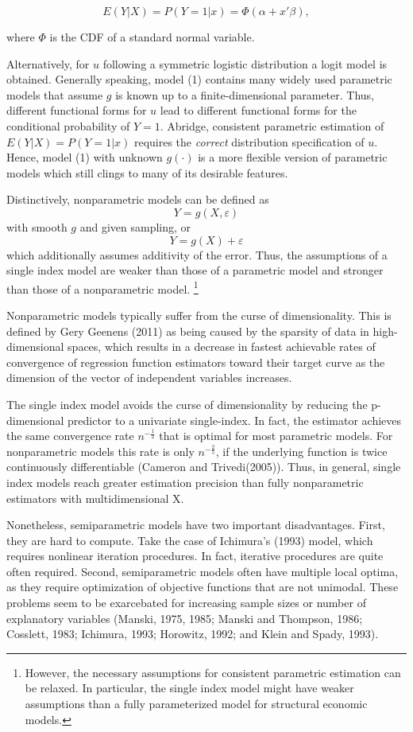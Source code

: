 \documentclass[a4paper]{article}
\begin{document}
\[
E(Y|X) = P(Y=1|x) = \Phi(\alpha + x'\beta),
\]

where $\Phi$ is the CDF of a standard normal variable. 

Alternatively, for $u$ following a symmetric logistic distribution a logit model is obtained. Generally speaking, model (1) contains many widely used parametric models that assume $g$ is known up to a finite-dimensional parameter. Thus, different functional forms for $u$ lead to different functional forms for the conditional probability of $Y = 1$. Abridge, consistent parametric estimation of $E(Y|X) = P(Y=1|x)$ requires the \textit{correct} distribution specification of $u$. 
Hence, model (1) with unknown $g(\cdot)$ is a more flexible version of parametric models which still clings to many of its desirable features. 

Distinctively, nonparametric models can be defined as
\[Y = g(X, \varepsilon)\]
with smooth $g$ and given sampling,  or  
\[Y = g(X) + \varepsilon\]
which additionally assumes additivity of the error. Thus, the assumptions of a single index model are weaker than those of a parametric model and stronger than those of a nonparametric model.  \footnote{However, the necessary assumptions for consistent parametric estimation can be relaxed. In particular, the single index model might have weaker assumptions than a fully parameterized model for structural economic models.} 

Nonparametric models typically suffer from the curse of dimensionality. This is defined by Gery Geenens (2011) as being caused by the sparsity of data in high-dimensional spaces, which results in a decrease in fastest achievable rates of convergence of regression function estimators toward their target curve as the dimension of the vector of independent variables increases. 

The single index model avoids the curse of dimensionality by reducing the p-dimensional predictor to a univariate single-index. In fact, the estimator achieves the same convergence rate $n^{-\frac{1}{2}}$ that is optimal for most parametric models. For nonparametric models this rate is only $n^{-\frac{2}{5}}$, if the underlying function is twice continuously differentiable (Cameron and Trivedi(2005)).
Thus, in general, single index models reach greater estimation precision than fully nonparametric estimators with multidimensional X.



Nonetheless, semiparametric models have two important disadvantages. First, they are hard to compute. Take the case of Ichimura's (1993) model, which requires nonlinear iteration procedures. In fact, iterative procedures are quite often required. Second, semiparametric models often have multiple local optima, as they require optimization of objective functions that are not unimodal. These problems seem to be exarcebated for increasing sample sizes or number of explanatory variables (Manski, 1975, 1985; Manski and Thompson, 1986; Cosslett, 1983; Ichimura, 1993; Horowitz, 1992; and Klein and Spady, 1993).
\end{document}
